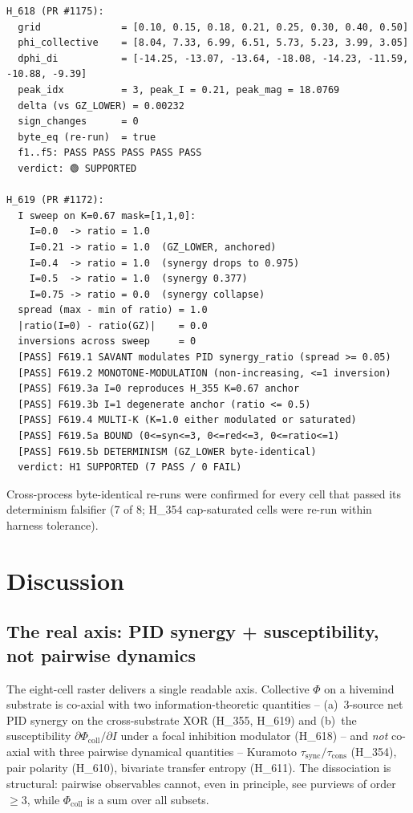 \documentclass[11pt,a4paper]{article}
\begin{document}
\begin{lstlisting}[basicstyle=\ttfamily\scriptsize,frame=single,xleftmargin=0pt,breaklines=true]
H_618 (PR #1175):
  grid              = [0.10, 0.15, 0.18, 0.21, 0.25, 0.30, 0.40, 0.50]
  phi_collective    = [8.04, 7.33, 6.99, 6.51, 5.73, 5.23, 3.99, 3.05]
  dphi_di           = [-14.25, -13.07, -13.64, -18.08, -14.23, -11.59, -10.88, -9.39]
  peak_idx          = 3, peak_I = 0.21, peak_mag = 18.0769
  delta (vs GZ_LOWER) = 0.00232
  sign_changes      = 0
  byte_eq (re-run)  = true
  f1..f5: PASS PASS PASS PASS PASS
  verdict: 🟢 SUPPORTED

H_619 (PR #1172):
  I sweep on K=0.67 mask=[1,1,0]:
    I=0.0  -> ratio = 1.0
    I=0.21 -> ratio = 1.0  (GZ_LOWER, anchored)
    I=0.4  -> ratio = 1.0  (synergy drops to 0.975)
    I=0.5  -> ratio = 1.0  (synergy 0.377)
    I=0.75 -> ratio = 0.0  (synergy collapse)
  spread (max - min of ratio) = 1.0
  |ratio(I=0) - ratio(GZ)|    = 0.0
  inversions across sweep     = 0
  [PASS] F619.1 SAVANT modulates PID synergy_ratio (spread >= 0.05)
  [PASS] F619.2 MONOTONE-MODULATION (non-increasing, <=1 inversion)
  [PASS] F619.3a I=0 reproduces H_355 K=0.67 anchor
  [PASS] F619.3b I=1 degenerate anchor (ratio <= 0.5)
  [PASS] F619.4 MULTI-K (K=1.0 either modulated or saturated)
  [PASS] F619.5a BOUND (0<=syn<=3, 0<=red<=3, 0<=ratio<=1)
  [PASS] F619.5b DETERMINISM (GZ_LOWER byte-identical)
  verdict: H1 SUPPORTED (7 PASS / 0 FAIL)
\end{lstlisting}

Cross-process byte-identical re-runs were confirmed for every cell
that passed its determinism falsifier (7 of 8; H\_354 cap-saturated
cells were re-run within harness tolerance).

\section{Discussion}
\label{sec:discussion}

\subsection{The real axis: PID synergy + susceptibility, not pairwise dynamics}

The eight-cell raster delivers a single readable axis. Collective
$\Phi$ on a hivemind substrate is co-axial with two information-theoretic
quantities --
(a)~3-source net PID synergy on the cross-substrate XOR
(H\_355, H\_619) and
(b)~the susceptibility $\partial\Phi_{\mathrm{coll}}/\partial I$
under a focal inhibition modulator (H\_618) --
and \emph{not} co-axial with three pairwise dynamical quantities --
Kuramoto $\tau_{\mathrm{sync}}/\tau_{\mathrm{cons}}$ (H\_354), pair
polarity (H\_610), bivariate transfer entropy (H\_611). The
dissociation is structural: pairwise observables cannot, even in
principle, see purviews of order $\geq 3$, while
$\Phi_{\mathrm{coll}}$ is a sum over all subsets.
\end{document}
